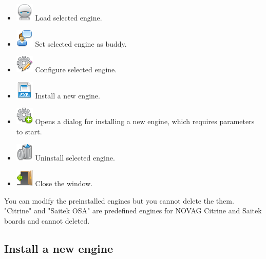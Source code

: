 \documentclass[11pt,a4paper]{article}
\begin{document}
	\begin{itemize}
		\item \includegraphics[scale=0.5]{robot.png} Load selected engine.
		\item \includegraphics[scale=0.5]{user_comment.png} Set selected engine as buddy.
		\item \includegraphics[scale=0.5]{cog_edit.png} Configure selected engine.
		\item \includegraphics[scale=0.5]{file_extension_exe.png} Install a new engine.
		\item \includegraphics[scale=0.5]{cog_add.png} Opens a dialog for installing a new engine, which requires parameters to start.
		\item \includegraphics[scale=0.5]{bin.png} Uninstall selected engine.
		\item \includegraphics[scale=0.5]{door_out.png} Close the window.
	\end{itemize}
	You can modify the preinstalled engines but you cannot delete the them.\\
	"Citrine" and "Saitek OSA" are predefined engines for NOVAG Citrine and Saitek boards and cannot deleted.\\
	
	\subsection{Install a new engine} \label{InstallEngine}
	
\end{document}
